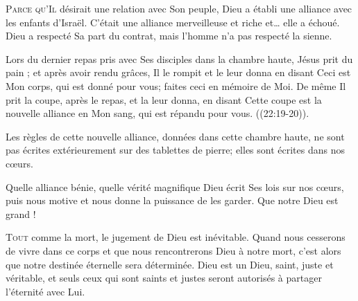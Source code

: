 

\lettrine{P}{arce qu'Il} désirait une relation avec Son peuple,
 Dieu a établi une alliance avec les enfants d'Israël.
 C'était une alliance merveilleuse et riche et\dots{} elle a échoué.
 Dieu a respecté Sa part du contrat, mais l'homme n'a pas respecté la sienne. 


Lors du dernier repas pris avec Ses disciples dans la chambre haute,
 Jésus \Og prit du pain ; et après avoir rendu grâces, Il le rompit
 et le leur donna en disant\frcolon{} Ceci est Mon corps, qui est donné pour vous;
 faites ceci en mémoire de Moi. De même Il prit la coupe, après le repas,
 et la leur donna, en disant\frcolon{} Cette coupe est la nouvelle alliance
 en Mon sang, qui est répandu pour vous. \Fg{} ((22:19-20)). 

Les règles de cette nouvelle alliance, données dans cette chambre haute,
 ne sont pas écrites extérieurement sur des tablettes de pierre;
 elles sont écrites dans nos c\oe{}urs. 

Quelle alliance bénie, quelle vérité magnifique\frcolon{}
 Dieu écrit Ses lois sur nos c\oe{}urs, puis nous motive et nous donne
 la puissance de les garder. Que notre Dieu est grand ! 

\dvrule






\lettrine{T}{out} comme la mort, le jugement de Dieu est inévitable.
 Quand nous cesserons de vivre dans ce corps et que nous rencontrerons
 Dieu à notre mort, c'est alors que notre destinée éternelle
 sera déterminée. Dieu est un Dieu, saint, juste et véritable,
 et seuls ceux qui sont saints et justes seront autorisés
 à partager l'éternité avec Lui. 

